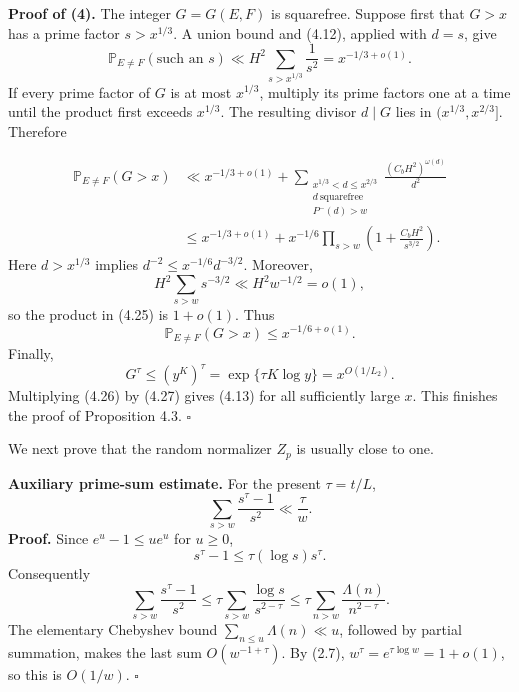 \documentclass[10pt,letterpaper]{article}
\newcommand{\PP}{\mathbb{P}}
\newcommand{\qedmark}{\(\square\)}
\begin{document}
\textbf{Proof of (4).} The integer $G=G(E,F)$ is squarefree. Suppose first that $G>x$ has a prime factor $s>x^{1/3}$.
A union bound and (4.12), applied with $d=s$, give
\begin{equation}
\PP_{E\ne F}(\text{such an }s)\ll H^2\sum_{s>x^{1/3}}\frac1{s^2}=x^{-1/3+o(1)}.
\tag{4.24}
\end{equation}
If every prime factor of $G$ is at most $x^{1/3}$, multiply its prime factors one at a time until the product first
exceeds $x^{1/3}$. The resulting divisor $d\mid G$ lies in $(x^{1/3},x^{2/3}]$. Therefore

\begin{equation}
\begin{aligned}
\PP_{E\ne F}(G>x)&\ll x^{-1/3+o(1)}
+\sum_{\substack{x^{1/3}<d\le x^{2/3}\\d\ \mathrm{squarefree}\\P^-(d)>w}}
\frac{(C_bH^2)^{\omega(d)}}{d^2}\\
&\le x^{-1/3+o(1)}+x^{-1/6}\prod_{s>w}\left(1+\frac{C_bH^2}{s^{3/2}}\right).
\end{aligned}
\tag{4.25}
\end{equation}
Here $d>x^{1/3}$ implies $d^{-2}\le x^{-1/6}d^{-3/2}$. Moreover,
\[
H^2\sum_{s>w}s^{-3/2}\ll H^2w^{-1/2}=o(1),
\]
so the product in (4.25) is $1+o(1)$. Thus
\begin{equation}
\PP_{E\ne F}(G>x)\le x^{-1/6+o(1)}.
\tag{4.26}
\end{equation}
Finally,
\begin{equation}
G^\tau\le(y^K)^\tau=\exp\{\tau K\log y\}=x^{O(1/L_2)}.
\tag{4.27}
\end{equation}
Multiplying (4.26) by (4.27) gives (4.13) for all sufficiently large $x$. This finishes the proof of Proposition 4.3. \qedmark

We next prove that the random normalizer $Z_p$ is usually close to one.

\textbf{Auxiliary prime-sum estimate.} For the present $\tau=t/L$,
\begin{equation}
\sum_{s>w}\frac{s^\tau-1}{s^2}\ll\frac\tau w.
\tag{4.28}
\end{equation}
\textbf{Proof.} Since $e^u-1\le ue^u$ for $u\ge0$,
\[
s^\tau-1\le\tau(\log s)s^\tau.
\]
Consequently
\[
\sum_{s>w}\frac{s^\tau-1}{s^2}
\le\tau\sum_{s>w}\frac{\log s}{s^{2-\tau}}
\le\tau\sum_{n>w}\frac{\Lambda(n)}{n^{2-\tau}}.
\]
The elementary Chebyshev bound $\sum_{n\le u}\Lambda(n)\ll u$, followed by partial summation, makes the last sum
$O(w^{-1+\tau})$. By (2.7), $w^\tau=e^{\tau\log w}=1+o(1)$, so this is $O(1/w)$. \qedmark
\end{document}
